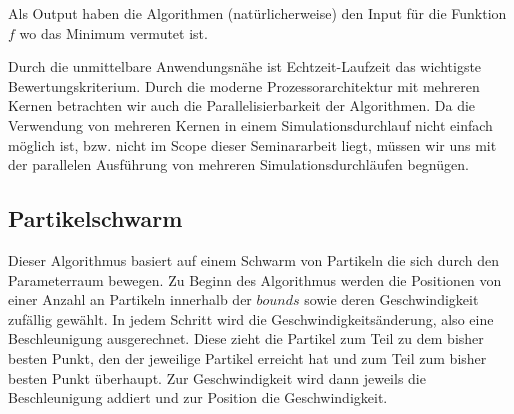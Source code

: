 \documentclass[a4paper,12pt]{article}
\begin{document}
Als Output haben die Algorithmen (natürlicherweise) den Input für die Funktion $f$ wo das Minimum vermutet ist. 

Durch die unmittelbare Anwendungsnähe ist Echtzeit-Laufzeit das wichtigste Bewertungskriterium. Durch die moderne Prozessorarchitektur mit mehreren Kernen betrachten wir auch die Parallelisierbarkeit der Algorithmen. Da die Verwendung von mehreren Kernen in einem Simulationsdurchlauf nicht einfach möglich ist, bzw. nicht im Scope dieser Seminararbeit liegt, müssen wir uns mit der parallelen Ausführung von mehreren Simulationsdurchläufen begnügen.

\subsection{Partikelschwarm}

Dieser Algorithmus basiert auf einem Schwarm von Partikeln die sich durch den Parameterraum bewegen. Zu Beginn des Algorithmus werden die Positionen von einer Anzahl an Partikeln innerhalb der $bounds$ sowie deren Geschwindigkeit zufällig gewählt. In jedem Schritt wird die Geschwindigkeitsänderung, also eine Beschleunigung ausgerechnet. Diese zieht die Partikel zum Teil zu dem bisher besten Punkt, den der jeweilige Partikel erreicht hat und zum Teil zum bisher besten Punkt überhaupt. Zur Geschwindigkeit wird dann jeweils die Beschleunigung addiert und zur Position die Geschwindigkeit. 
\end{document}
